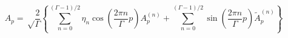 \begin{equation}
A_p=\sqrt \frac{2}{\Gamma}\left\{ \sum_{n=0}^{(\Gamma -1)/2} \eta_n
\cos (\frac{2\pi n}{\Gamma}p)A^{(n)}_p +\sum_{n=0}^{(\Gamma -1)/2} 
\sin (\frac{2\pi n}{\Gamma}p)\tilde A^{(n)}_p \right\}
\end{equation}

